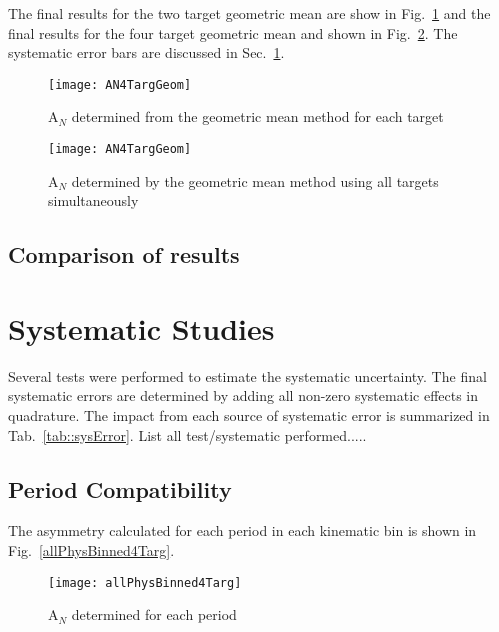 \noindent
The final results for the two target geometric mean are show in
Fig.~\ref{fig::ANgeom} and the final results for the four target geometric mean
and shown in Fig.~\ref{fig::AN4TargGeom}.  The systematic error bars are
discussed in Sec.~\ref{sec::systematics}.

\begin{figure}[h!t]
  \begin{center}
    \texttt{[image: AN4TargGeom]}
    \caption{A$_N$ determined from the geometric mean method for each target}
    \label{fig::ANgeom}
  \end{center}
\end{figure}

\begin{figure}[h!t]
  \begin{center}
    \texttt{[image: AN4TargGeom]}
    \caption{A$_N$ determined by the geometric mean method using all targets
      simultaneously}
    \label{fig::AN4TargGeom}
  \end{center}
\end{figure}

\subsection{Comparison of results}


\section{Systematic Studies} \label{sec::systematics}
Several tests were performed to estimate the systematic uncertainty.  The final
systematic errors are determined by adding all non-zero systematic effects in
quadrature.  The impact from each source of systematic error is summarized in
Tab.~\ref{tab::sysError}.  List all test/systematic performed.....

\subsection{Period Compatibility}
The asymmetry calculated for each period in each kinematic bin is shown in
Fig.~\ref{allPhysBinned4Targ}.

\begin{figure}[h!t]
  \begin{center}
    \texttt{[image: allPhysBinned4Targ]}
    \caption{A$_N$ determined for each period}
    \label{fig::allPhysBinned4Targ}
  \end{center}
\end{figure}

